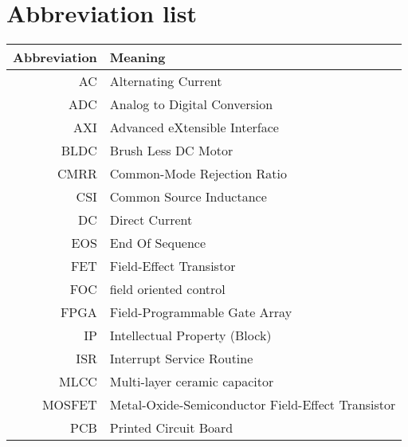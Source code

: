 \section{Abbreviation list}
\label{sec:abbreviation_list}

\begin{table}[H]
\centering
\begin{tabular}{|r|l|}
\hline
\textbf{Abbreviation} & \textbf{Meaning}                                        \\ \hline
AC           & Alternating Current                                              \\ \hline
ADC          & Analog to Digital Conversion                                     \\ \hline
AXI          & Advanced eXtensible Interface                                    \\ \hline
BLDC         & Brush Less DC Motor                                              \\ \hline
CMRR         & Common-Mode Rejection Ratio                                      \\ \hline
CSI          & Common Source Inductance                                         \\ \hline
DC           & Direct Current                                                   \\ \hline
EOS          & End Of Sequence                                                  \\ \hline
FET          & Field-Effect Transistor                                          \\ \hline
FOC          & field oriented control                                           \\ \hline
FPGA         & Field-Programmable Gate Array                                    \\ \hline
IP           & Intellectual Property (Block)                                    \\ \hline
ISR          & Interrupt Service Routine                                        \\ \hline
MLCC         & Multi-layer ceramic capacitor                                    \\ \hline
MOSFET       & Metal-Oxide-Semiconductor Field-Effect Transistor                \\ \hline
PCB          & Printed Circuit Board                                            \\ \hline

\end{tabular}
\end{table}
